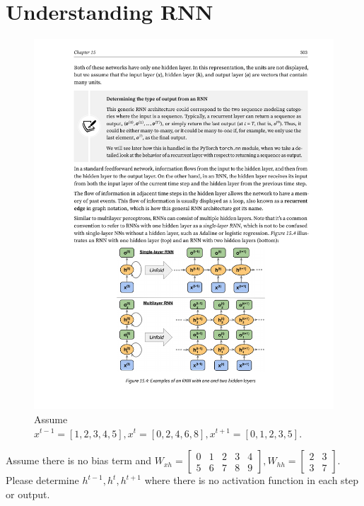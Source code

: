 \documentclass[11pt]{article}
\begin{document}
\section*{Understanding RNN}
\begin{figure}[h!]
	\centering
	\includegraphics[width=0.9\linewidth]{RNN}
	\caption{Assume $x^{t-1}=[1, 2, 3, 4, 5], x^{t}=[0, 2, 4, 6, 8], x^{t+1}=[0, 1, 2, 3, 5]$.}
	\label{fig:rnn}
\end{figure}
\noindent Assume there is no bias term and $W_{xh}=\begin{bmatrix}
	0 & 1 & 2 & 3 &4 \\ 
	5 &  6& 7 &  8& 9
\end{bmatrix}, W_{hh}=\begin{bmatrix}
2 & 3  \\ 
3 &  7
\end{bmatrix}$. Please determine $h^{t-1},h^{t},h^{t+1}$ where there is no activation function in each step or output.
\newpage
\end{document}
